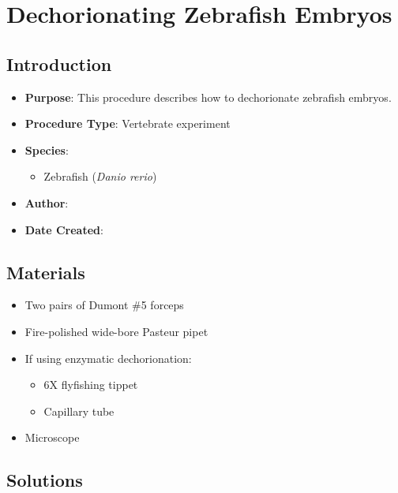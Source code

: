 \documentclass[
  letterpaper,
  DIV=11,
  numbers=noendperiod]{scrreprt}
\providecommand{\tightlist}{%
  \setlength{\itemsep}{0pt}\setlength{\parskip}{0pt}}\usepackage{longtable,booktabs,array}
\begin{document}
\hypertarget{sec-vert_exp--zfish_dechorinate}{%
\chapter{Dechorionating Zebrafish
Embryos}\label{sec-vert_exp--zfish_dechorinate}}

\hypertarget{introduction-68}{%
\section{Introduction}\label{introduction-68}}

\begin{itemize}
\tightlist
\item
  \textbf{Purpose}: This procedure describes how to dechorionate
  zebrafish embryos.
\item
  \textbf{Procedure Type}: Vertebrate experiment
\item
  \textbf{Species}:

  \begin{itemize}
  \tightlist
  \item
    Zebrafish (\emph{Danio rerio})
  \end{itemize}
\item
  \textbf{Author}:
\item
  \textbf{Date Created}:
\end{itemize}

\hypertarget{materials-65}{%
\section{Materials}\label{materials-65}}

\begin{itemize}
\tightlist
\item
  Two pairs of Dumont \#5 forceps
\item
  Fire-polished wide-bore Pasteur pipet
\item
  If using enzymatic dechorionation:

  \begin{itemize}
  \tightlist
  \item
    6X flyfishing tippet
  \item
    Capillary tube
  \end{itemize}
\item
  Microscope
\end{itemize}

\hypertarget{solutions-56}{%
\section{Solutions}\label{solutions-56}}
\end{document}
